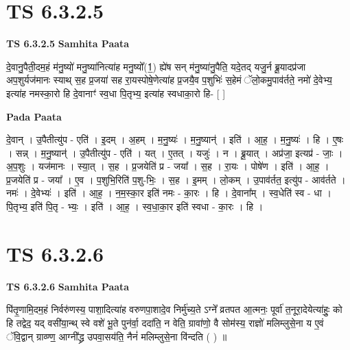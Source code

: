 \documentclass[17pt]{extarticle}
\begin{document}
\section{ TS 6.3.2.5 }

\textbf{TS 6.3.2.5 } \newline
\textbf{Samhita Paata} \newline

दे॒वानु॒पैती॒दम॒हं म॑नु॒ष्यो॑ मनु॒ष्या॑नित्या॑ह मनु॒ष्यो᳚(1॒) ह्ये॑ष सन् म॑नु॒ष्या॑नु॒पैति॒ यदे॒तद् यजु॒र्न ब्रू॒यादप्र॑जा अप॒शुर्यज॑मानः स्याथ् स॒ह प्र॒जया॑ सह रा॒यस्पोषे॒णेत्या॑ह प्र॒जयै॒व प॒शुभिः॑ स॒हेमं ॅलो॒कमु॒पाव॑र्तते॒ नमो॑ दे॒वेभ्य॒ इत्या॑ह नमस्का॒रो हि दे॒वानाꣳ॑ स्व॒धा पि॒तृभ्य॒ इत्या॑ह स्वधाका॒रो हि- [  ] \newline

\textbf{Pada Paata} \newline

दे॒वान् । उ॒पैतीत्यु॑प - एति॑ । इ॒दम् । अ॒हम् । म॒नु॒ष्यः॑ । म॒नु॒ष्यान्॑ । इति॑ । आ॒ह॒ । म॒नु॒ष्यः॑ । हि । ए॒षः । सन्न् । म॒नु॒ष्यान्॑ । उ॒पैतीत्यु॑प - एति॑ । यत् । ए॒तत् । यजुः॑ । न । ब्रू॒यात् । अप्र॑जा॒ इत्यप्र॑ - जाः॒ । अ॒प॒शुः । यज॑मानः । स्या॒त् । स॒ह । प्र॒जयेति॑ प्र - जया᳚ । स॒ह । रा॒यः । पोषे॑ण । इति॑ । आ॒ह॒ । प्र॒जयेति॑ प्र - जया᳚ । ए॒व । प॒शुभि॒रिति॑ प॒शु-भिः॒ । स॒ह । इ॒मम् । लो॒कम् । उ॒पाव॑र्तत॒ इत्यु॑प - आव॑र्तते । नमः॑ । दे॒वेभ्यः॑ । इति॑ । आ॒ह॒ । न॒म॒स्का॒र इति॑ नमः - का॒रः । हि । दे॒वाना᳚म् । स्व॒धेति॑ स्व - धा । पि॒तृभ्य॒ इति॑ पि॒तृ - भ्यः॒ । इति॑ । आ॒ह॒ । स्व॒धा॒का॒र इति॑ स्वधा - का॒रः । हि ।  \newline





\section{ TS 6.3.2.6 }

\textbf{TS 6.3.2.6 } \newline
\textbf{Samhita Paata} \newline

पि॑तृ॒णामि॒दम॒हं निर्वरु॑णस्य॒ पाशा॒दित्या॑ह वरुणपा॒शादे॒व निर्मु॑च्य॒ते ऽग्ने᳚ व्रतपत आ॒त्मनः॒ पूर्वा॑ त॒नूरा॒देयेत्या॑हुः॒ को हि तद्वेद॒ यद् वसी॑या॒न्थ् स्वे वशे॑ भू॒ते पुन॑र्वा॒ ददा॑ति॒ न वेति॒ ग्रावा॑णो॒ वै सोम॑स्य॒ राज्ञो॑ मलिम्लुसे॒ना य ए॒वं ॅवि॒द्वान् ग्राव्ण्ण॒॒ आग्नी᳚द्ध्र उपवा॒सय॑ति॒ नैनं॑ मलिम्लुसे॒ना वि॑न्दति ( ) ॥ \newline
\end{document}
